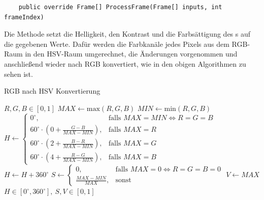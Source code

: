 \begin{itemize}
	\begin{verbatim}
	public override Frame[] ProcessFrame(Frame[] inputs, int frameIndex)
	\end{verbatim}
	Die Methode  setzt die Helligkeit, den Kontrast und die Farbsättigung des s auf die gegebenen Werte. Dafür werden die Farbkanäle jedes Pixels aus dem RGB-Raum in den HSV-Raum umgerechnet, die Änderungen vorgenommen und anschließend wieder nach RGB konvertiert, wie in den obigen Algorithmen zu sehen ist.
	\begin{algorithm}
	\caption{RGB nach HSV Konvertierung}
		\begin{algorithmic}[1]
		\REQUIRE $ R, G, B \in [0, 1] $
		\STATE $ MAX \gets \text{max}(R, G, B) $
		\STATE $ MIN \gets \text{min}(R, G, B) $ 
		\vspace{5px}
		\STATE $
					H \gets
					\begin{cases}
						0^{\circ}, & \text{falls } MAX = MIN \Leftrightarrow R = G = B \\
						60^{\circ}\cdot(0 + \frac{G - B}{MAX - MIN}), & \text{falls } MAX = R \\
						60^{\circ}\cdot(2 + \frac{B - R}{MAX - MIN}), & \text{falls } MAX = G \\
						60^{\circ}\cdot(4 + \frac{R - G}{MAX - MIN}), & \text{falls } MAX = B
					\end{cases}
				$  
				\vspace{5px}
			\STATE $ H \gets H + 360^{\circ} $
		\ENDIF 
		\vspace{5px}
		\STATE $ 
					S \gets
					\begin{cases}
						0, & \text{falls } MAX = 0 \Leftrightarrow R = G = B = 0 \\
						\frac{MAX - MIN}{MAX}, & \text{sonst}
					\end{cases}
				$
		\vspace{5px}
		\STATE $ V \gets MAX $ 
		\ENSURE $ H \in [0^{\circ}, 360^{\circ}],\ S, V \in [0, 1] $
	\end{algorithmic}
	\end{algorithm}
	

\end{itemize}
